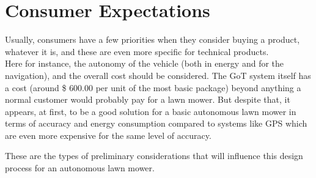 \section{Consumer Expectations}
Usually, consumers have a few priorities when they consider buying a product, whatever it is, and these are even more specific for technical products.\\
Here for instance, the autonomy of the vehicle (both in energy and for the navigation), and the overall cost should be considered. The GoT system itself has a cost (around \$ $600.00$ per unit of the most basic package) beyond anything a normal customer would probably pay for a lawn mower. But despite that, it appears, at first, to be a good solution for a basic autonomous lawn mower in terms of accuracy and energy consumption compared to systems like GPS which are even more expensive for the same level of accuracy.

These are the types of preliminary considerations that will influence this design process for an autonomous lawn mower.